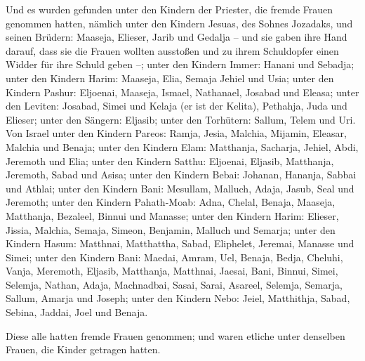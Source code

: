 Und es wurden gefunden unter den Kindern der Priester,
die fremde Frauen genommen hatten, nämlich unter den Kindern Jesuas, des
Sohnes Jozadaks, und seinen Brüdern: Maaseja, Elieser, Jarib und Gedalja
 -- und sie gaben ihre Hand darauf, dass sie die Frauen
wollten ausstoßen und zu ihrem Schuldopfer einen Widder für ihre Schuld
geben --;  unter den Kindern Immer: Hanani und Sebadja;
 unter den Kindern Harim: Maaseja, Elia, Semaja Jehiel
und Usia;  unter den Kindern Pashur: Eljoenai, Maaseja,
Ismael, Nathanael, Josabad und Eleasa;  unter den
Leviten: Josabad, Simei und Kelaja (er ist der Kelita), Pethahja, Juda
und Elieser;  unter den Sängern: Eljasib; unter den
Torhütern: Sallum, Telem und Uri.  Von Israel unter den
Kindern Pareos: Ramja, Jesia, Malchia, Mijamin, Eleasar, Malchia und
Benaja;  unter den Kindern Elam: Matthanja, Sacharja,
Jehiel, Abdi, Jeremoth und Elia;  unter den Kindern
Satthu: Eljoenai, Eljasib, Matthanja, Jeremoth, Sabad und Asisa;
 unter den Kindern Bebai: Johanan, Hananja, Sabbai und
Athlai;  unter den Kindern Bani: Mesullam, Malluch,
Adaja, Jasub, Seal und Jeremoth;  unter den Kindern
Pahath-Moab: Adna, Chelal, Benaja, Maaseja, Matthanja, Bezaleel, Binnui
und Manasse;  unter den Kindern Harim: Elieser, Jissia,
Malchia, Semaja, Simeon,  Benjamin, Malluch und Semarja;
 unter den Kindern Hasum: Matthnai, Matthattha, Sabad,
Eliphelet, Jeremai, Manasse und Simei;  unter den Kindern
Bani: Maedai, Amram, Uel,  Benaja, Bedja, Cheluhi,
 Vanja, Meremoth, Eljasib,  Matthanja,
Matthnai, Jaesai,  Bani, Binnui, Simei, 
Selemja, Nathan, Adaja,  Machnadbai, Sasai, Sarai,
 Asareel, Selemja, Semarja,  Sallum,
Amarja und Joseph;  unter den Kindern Nebo: Jeiel,
Matthithja, Sabad, Sebina, Jaddai, Joel und Benaja.

 Diese alle hatten fremde Frauen genommen; und waren
etliche unter denselben Frauen, die Kinder getragen hatten.
